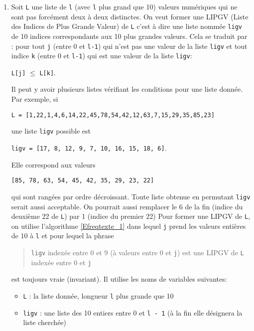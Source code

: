 \begin{enumerate}
  \item Soit \texttt{L} une liste de \texttt{l} (avec \texttt{l} plus grand que 10) valeurs numériques qui ne sont pas forcément deux à deux distinctes. On veut former une LIPGV (Liste des Indices de Plus Grande Valeur) de \texttt{L} c'est à dire une liste nommée \texttt{ligv} de 10 indices correspondants aux 10 plus grandes valeurs. \newline
  Cela se traduit par : pour tout \texttt{j} (entre 0 et \texttt{l-1}) qui n'est pas une valeur de la liste \texttt{ligv} et tout indice \texttt{k} (entre 0 et \texttt{l-1}) qui est une valeur de la liste \texttt{ligv}: 
  \begin{center}
    \texttt{L[j]} $\leq$ \texttt{L[k]}. 
  \end{center}
Il peut y avoir plusieurs listes vérifiant les conditions pour une liste donnée. Par exemple, si
\begin{center}
  \verb|L = [1,22,1,4,6,14,22,45,78,54,42,12,63,7,15,29,35,85,23]|  
\end{center}
une liste \texttt{ligv} possible est
\begin{center}
  \verb|ligv = [17, 8, 12, 9, 7, 10, 16, 15, 18, 6]|.
\end{center}
Elle correspond aux valeurs
\begin{center}
\verb|[85, 78, 63, 54, 45, 42, 35, 29, 23, 22]|  
\end{center}
qui sont rangées par ordre décroissant.\newline
Toute liste obtenue en permutant \texttt{ligv} serait aussi acceptable. On pourrait aussi remplacer le 6 de la fin (indice du deuxième 22 de \texttt{L}) par 1 (indice du premier 22)\newline  
Pour former une LIPGV  de \texttt{L}, on utilise l'algorithme \ref{Efreqtexte_1} dans lequel \texttt{j} prend les valeurs entières de 10 à \texttt{l} et pour lequel la phrase
\begin{quote}
 \og \texttt{ligv} indexée entre 0 et 9 (à valeurs entre 0 et \texttt{j}) est une LIPGV de \texttt{L} indexée entre 0 et \texttt{j}\fg
\end{quote}
est toujours vraie (invariant). Il utilise les noms de variables suivantes:
\begin{itemize}
  \item \texttt{L} : la liste donnée, longueur \texttt{l} plus grande que 10
  \item \texttt{ligv} : une liste des 10 entiers entre 0 et \texttt{l - 1} (à la fin elle désignera la liste cherchée)  

\end{itemize}
\end{enumerate}
